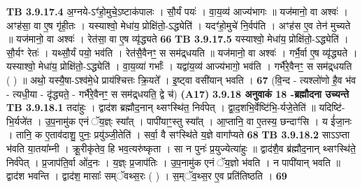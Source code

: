 \documentclass[17pt]{extarticle}
\begin{document}
{{{{{{{{{{{{{{{{{{{{{{                                \textbf{ TB 3.9.17.4} \newline
                  अ॒ग्नये-ऽꣳ॑हो॒मुचे॒ऽष्टाक॑पालः । सौ॒र्यं पयः॑ । वा॒य॒व्य॑ आज्य॑भागः ॥ यज॑मानो॒ वा अश्वः॑ । अꣳह॑सा॒ वा ए॒ष गृ॑ही॒तः । यस्याश्वो॒ मेधा॑य॒ प्रोक्षि॑तो॒-ऽद्ध्येति॑ । यदꣳ॑हो॒मुचे॑ नि॒र्वप॑ति । अꣳह॑स ए॒व तेन॑ मुच्यते ॥ यज॑मानो॒ वा अश्वः॑ । रेत॑सा॒ वा ए॒ष व्यृ॑द्ध्यते \textbf{ 66} \newline
                  \newline
                                \textbf{ TB 3.9.17.5} \newline
                  यस्याश्वो॒ मेधा॑य॒ प्रोक्षि॑तो॒-ऽद्ध्येति॑ । सौ॒र्यꣳ रेतः॑ । यथ्सौ॒र्यं पयो॒ भव॑ति । रेत॑सै॒वैनꣳ॒॒ स सम॑द्र्धयति ॥ यज॑मानो॒ वा अश्वः॑ । गर्भै॒र्वा ए॒ष व्यृ॑द्ध्यते । यस्याश्वो॒ मेधा॑य॒ प्रोक्षि॑तो॒-ऽद्ध्येति॑ । वा॒य॒व्या॑ गर्भाः᳚ । यद्वा॑य॒व्य॑ आज्य॑भागो॒ भव॑ति । गर्भै॑रे॒वैनꣳ॒॒ स सम॑द्र्धयति ( ) ॥ अथो॒ यस्यै॒षा-ऽश्व॑मे॒धे प्राय॑श्चित्तः क्रि॒यते᳚ । इ॒ष्ट्वा वसी॑यान् भवति । \textbf{ 67} \newline
                  \newline
                                    (वि॒न्द - त्यश्लो॑णो है॒व भ॑व - त्यधी॒या - दृ॑द्ध्यते॒ - गर्भै॑रे॒वैनꣳ॒॒ स सम॑द्र्धयति॒ द्वे च॑) \textbf{(A17)} \newline \newline
                \textbf{ 3.9.18    अनुवाकं   18 -ब्रह्मौदना उच्यन्ते} \newline
                                \textbf{ TB 3.9.18.1} \newline
                  तदा॑हुः । द्वाद॑श ब्रह्मौद॒नान् थ्सꣳस्थि॑त॒ निर्व॑पेत् । द्वा॒द॒शभि॒र्वेष्टि॑भि॒-र्यजे॒तेति॑ ॥ यदिष्टि॑-भि॒र्यजे॑त । उ॒प॒नामु॑क एनं ॅय॒ज्ञ्ः स्या᳚त् । पापी॑याꣳ॒॒स्तु स्या᳚त् । आ॒प्तानि॒ वा ए॒तस्य॒ छन्दाꣳ॑सि । य ई॑जा॒नः । तानि॒ क ए॒ताव॑दाशु॒ पुनः॒ प्रयु॑ञ्जी॒तेति॑ । सर्वा॒ वै सꣳस्थि॑ते य॒ज्ञे वागा᳚प्यते \textbf{ 68} \newline
                  \newline
                                \textbf{ TB 3.9.18.2} \newline
                  साऽऽप्ता भ॑वति या॒तया᳚म्नी । क्रू॒रीकृ॑तेव॒ हि भव॒त्यरु॑ष्कृता । सा न पुनः॑ प्र॒युज्येत्या॑हुः ॥ द्वाद॑शै॒व ब्र॑ह्मौद॒नान् थ्सꣳस्थि॑ते॒ निर्व॑पेत् । प्र॒जाप॑ति॒र्वा ओ॑द॒नः । य॒ज्ञ्ः प्र॒जाप॑तिः । उ॒प॒नामु॑क एनं ॅय॒ज्ञो भ॑वति । न पापी॑यान् भवति ॥ द्वाद॑श भवन्ति । द्वाद॑श॒ मासाः᳚ सम्ॅवथ्स॒रः ( ) । स॒म्ॅव॒थ्स॒र ए॒व प्रति॑तिष्ठति । \textbf{ 69} \newline
                  \newline
}}}}}}}}}}}}}}}}}}}}}}
\end{document}
